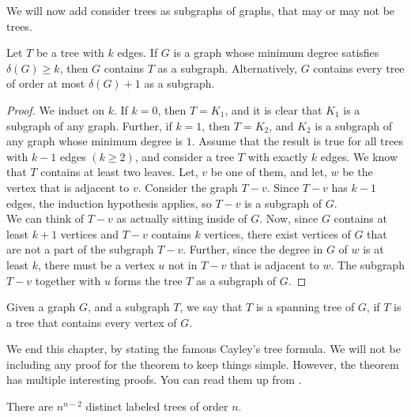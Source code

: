 We will now add consider trees as subgraphs of graphs, that may or may not be trees.

\begin{thm}
Let $T$ be a tree with $k$ edges. If $G$ is a graph whose minimum degree satisfies $\delta(G) \ge k$, then $G$ contains $T$ as a subgraph. Alternatively, $G$ contains every tree of order at most $\delta(G)+1$ as a subgraph.
\end{thm}
\begin{proof}
We induct on $k$. If $k=0$, then $T=K_{1}$, and it is clear that $K_{1}$ is a subgraph of any graph. Further, if $k=1$, then $T=K_{2}$, and $K_{2}$ is a subgraph of any graph whose minimum degree is $1$. Assume that the result is true for all trees with $k-1$ edges $(k \ge 2)$, and consider a tree $T$ with exactly $k$ edges. We know that $T$ contains at least two leaves. Let, $v$ be one of them, and let, $w$ be the vertex that is adjacent to $v$. Consider the graph $T-v$. Since $T-v$ has $k-1$ edges, the induction hypothesis applies, so $T-v$ is a subgraph of $G$.\\
We can think of $T-v$ as actually sitting inside of $G$. Now, since $G$ contains at least $k+1$ vertices and $T-v$ contains $k$ vertices, there exist vertices of $G$ that are not a part of the subgraph $T-v$. Further, since the degree in $G$ of $w$ is at least $k$, there must be a vertex $u$ not in $T-v$ that is adjacent to $w$. The subgraph $T-v$ together with $u$ forms the tree $T$ as a subgraph of $G$.
\end{proof}

\begin{defn}
    Given a graph $G$, and a subgraph $T$, we say that $T$ is a spanning tree of $G$, if $T$ is a tree that contains every vertex of $G$.
\end{defn}

We end this chapter, by stating the famous Cayley's tree formula. We will not be including any proof for the theorem to keep things simple. However, the theorem has multiple interesting proofs. You can read them up from .

\begin{thm}
    There are $n^{n-2}$ distinct labeled trees of order $n$.
\end{thm}

